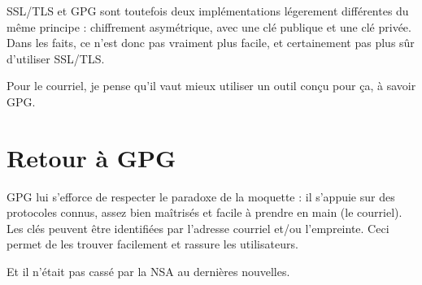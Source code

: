 SSL/TLS et GPG sont toutefois deux implémentations légerement
différentes du même principe : chiffrement asymétrique, avec une clé
publique et une clé privée. Dans les faits, ce n'est donc pas vraiment
plus facile, et certainement pas plus sûr d'utiliser SSL/TLS.

Pour le courriel, je pense qu'il vaut mieux utiliser un outil conçu pour ça, à savoir GPG.

\section{Retour à GPG}\label{retour-uxe0-gpg}

GPG lui s'efforce de respecter le paradoxe de la moquette : il s'appuie
sur des protocoles connus, assez bien maîtrisés et facile à prendre en
main (le courriel).\\Les clés peuvent être identifiées par l'adresse
courriel et/ou l'empreinte. Ceci permet de les trouver facilement et
rassure les utilisateurs.

Et il n'était pas cassé par la NSA au dernières nouvelles.
